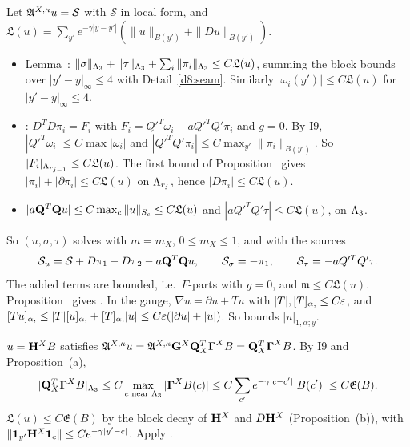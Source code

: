 \begin{detail}\label{d8:ix5}
Let $\mathfrak A^{X,\kappa}u=\mathcal S$ with $\mathcal S$ in local form, and $\mathfrak L(u)=\sum_{y'}e^{-\gamma|y-y'|}(\|u\|_{B(y')}+\|Du\|_{B(y')})$.
\begin{itemize}
\item Lemma~: $\|\sigma\|_{\Lambda_3}+\|\tau\|_{\Lambda_3}+\sum_i\|\pi_i\|_{\Lambda_3}\le C\mathfrak L(u)$, summing the block bounds over $|y'-y|_\infty\le4$ with Detail~\ref{d8:seam}. Similarly $|\omega_i(y')|\le C\mathfrak L(u)$ for $|y'-y|_\infty\le4$.
\item {}: $D^TD\pi_i=F_i$ with $F_i=Q'^T\omega_i-aQ'^TQ'\pi_i$ and $g=0$. By I9, $|Q'^T\omega_i|\le C\max|\omega_i|$ and $|Q'^TQ'\pi_i|\le C\max_{y'}\|\pi_i\|_{B(y')}$. So $|F_i|_{\Lambda_{r_{j-1}}}\le C\mathfrak L(u)$. The first bound of Proposition~ gives $|\pi_i|+|\partial\pi_i|\le C\mathfrak L(u)$ on $\Lambda_{r_j}$, hence $|D\pi_i|\le C\mathfrak L(u)$.
\item $|a\mathbf Q^T\mathbf Q u|\le C\max_c\|u\|_{S_c}\le C\mathfrak L(u)$ and $|aQ'^TQ'\tau|\le C\mathfrak L(u)$, on $\Lambda_3$.
\end{itemize}
So $(u,\sigma,\tau)$ solves  with $m=m_X$, $0\le m_X\le1$, and with the sources
\[
\mathcal S_u=\mathcal S+D\pi_1-D\pi_2-a\mathbf Q^T\mathbf Q u,\qquad\mathcal S_\sigma=-\pi_1,\qquad\mathcal S_\tau=-aQ'^TQ'\tau .
\]
The added terms are bounded, i.e.\ $F$-parts with $g=0$, and $\mathfrak m\le C\mathfrak L(u)$. Proposition~ gives . In the gauge, $\nabla u=\partial u+Tu$ with $|T|,[T]_{\alpha,}\le C\varepsilon$, and $[Tu]_{\alpha,}\le|T|[u]_{\alpha,}+[T]_{\alpha,}|u|\le C\varepsilon(|\partial u|+|u|)$. So  bounds $|u|_{1,\alpha;y}$.
\end{detail}

\begin{detail}\label{d8:ix6}
$u=\mathbf H^XB$ satisfies $\mathfrak A^{X,\kappa}u=\mathfrak A^{X,\kappa}\mathbf G^X\mathbf Q_X^T\boldsymbol\Gamma^XB=\mathbf Q_X^T\boldsymbol\Gamma^XB$. By I9 and Proposition~(a),
\[
|\mathbf Q_X^T\boldsymbol\Gamma^XB|_{\Lambda_3}\le C\max_{c\text{ near }\Lambda_3}|\boldsymbol\Gamma^XB(c)|\le C\sum_{c'}e^{-\gamma|c-c'|}|B(c')|\le C\mathfrak E(B).
\]
$\mathfrak L(u)\le C\mathfrak E(B)$ by the block decay of $\mathbf H^X$ and $D\mathbf H^X$ (Proposition~(b)), with $\|\mathbf 1_{y'}\mathbf H^X\mathbf 1_c\|\le Ce^{-\gamma|y'-c|}$. Apply .
\end{detail}

